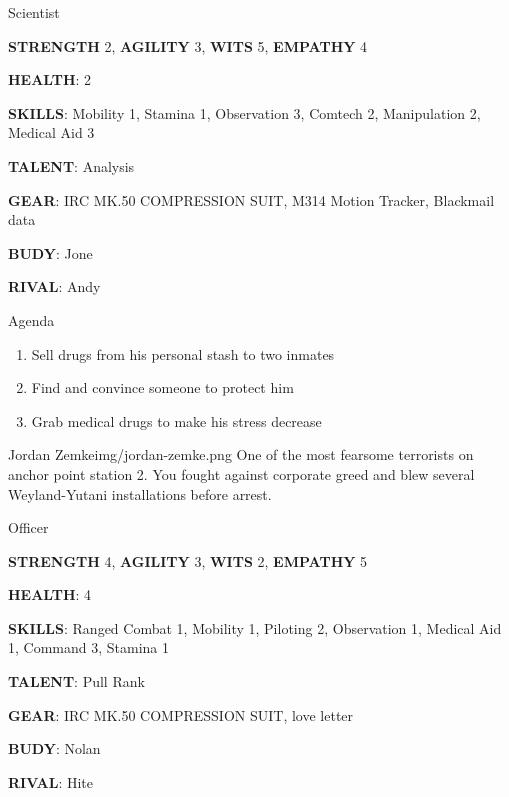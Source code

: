 \begin{rpg-commentbox}{}
    Scientist

    \textbf{STRENGTH} 2, \textbf{AGILITY} 3, \textbf{WITS} 5, \textbf{EMPATHY} 4

    \textbf{HEALTH}: 2

    \textbf{SKILLS}: Mobility 1, Stamina 1, Observation 3, Comtech 2, Manipulation 2, Medical Aid 3
    
    \textbf{TALENT}: Analysis
    
    \textbf{GEAR}: IRC MK.50 COMPRESSION SUIT, M314 Motion Tracker, Blackmail data

    \textbf{BUDY}: Jone
    
    \textbf{RIVAL}: Andy
\end{rpg-commentbox}


\begin{rpg-commentbox}{Agenda}
    \begin{enumerate}[label=\textbf{Act \arabic*}, leftmargin=1cm]
        \item Sell drugs from his personal stash to two inmates
        \item Find and convince someone to protect him
        \item Grab medical drugs to make his stress decrease
    \end{enumerate}
\end{rpg-commentbox}

\clearpage


\begin{rpg-pcbox}{Jordan Zemke}{img/jordan-zemke.png}
    One of the most fearsome terrorists on anchor point station 2. You fought against corporate greed and blew several Weyland-Yutani installations before arrest. 
\end{rpg-pcbox}

\begin{rpg-commentbox}{}
    Officer

    \textbf{STRENGTH} 4, \textbf{AGILITY} 3, \textbf{WITS} 2, \textbf{EMPATHY} 5

    \textbf{HEALTH}: 4

    \textbf{SKILLS}: Ranged Combat 1, Mobility 1, Piloting 2, Observation 1, Medical Aid 1, Command 3, Stamina 1
    
    \textbf{TALENT}: Pull Rank
    
    \textbf{GEAR}: IRC MK.50 COMPRESSION SUIT, love letter

    \textbf{BUDY}: Nolan
    
    \textbf{RIVAL}: Hite
\end{rpg-commentbox}



